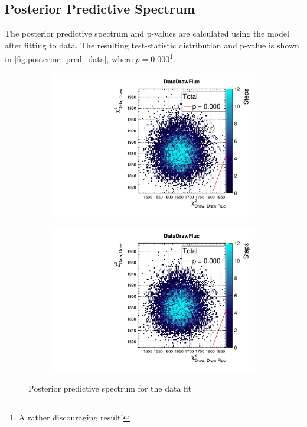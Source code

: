 \subsection{Posterior Predictive Spectrum}
\label{sec:post_pred_data}
The posterior predictive spectrum and p-values are calculated using the model after fitting to data. The resulting test-statistic distribution and p-value is shown in \autoref{fig:posterior_pred_data}, where $p = 0.000$\footnote{A rather discouraging result!}. 
\begin{figure}[h]
	\begin{subfigure}[t]{0.49\textwidth}
		\includegraphics[width=\textwidth, trim={0mm 0mm 0mm 11mm}, clip,page=1]{figures/mach3/data/postpred/2017b_NewData_NewDet_UpdXsecStep_2Xsec_4Det_5Flux_0_PostPred_procs}
	\end{subfigure}
	\begin{subfigure}[t]{0.49\textwidth}
		\includegraphics[width=\textwidth, trim={0mm 0mm 0mm 11mm}, clip,page=2]{figures/mach3/data/postpred/2017b_NewData_NewDet_UpdXsecStep_2Xsec_4Det_5Flux_0_PostPred_procs}
	\end{subfigure}
	\caption{Posterior predictive spectrum for the data fit}
	\label{fig:posterior_pred_data}
\end{figure}

